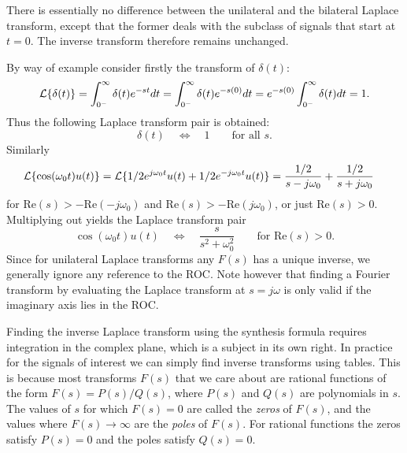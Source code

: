 \documentclass[10pt]{beamer}
\begin{document}
There is essentially no difference between the unilateral and the bilateral Laplace transform, except that the former deals with the subclass of signals that start at $t=0$.  The inverse transform therefore remains unchanged.

By way of example consider firstly the transform of $\delta(t)$:
\begin{equation*}
  {\cal L}\{ \delta(t) \} = \int_{0^-}^\infty \delta(t) e^{-st} dt =  \int_{0^-}^\infty \delta(t) e^{-s(0)} dt 
  = e^{-s(0)} \int_{0^-}^\infty \delta(t) dt = 1.
\end{equation*}
Thus the following Laplace transform pair is obtained:
\begin{equation*}
  \delta(t) \quad \Longleftrightarrow \quad 1 \qquad \text{for all $s$}.
\end{equation*}
Similarly 
\begin{align*}
  {\cal L}\{ \cos(\omega_0 t) u(t) \} &= {\cal L}\{ 1/2 e^{j \omega_0 t} u(t) + 1/2 e^{-j \omega_0 t} u(t) \} 
  = \frac{1/2}{s-j \omega_0} + \frac{1/2}{s+j \omega_0}
\end{align*}
for $\text{Re}(s) > - \text{Re}(-j \omega_0)$ and $\text{Re}(s) > - \text{Re}(j \omega_0)$, or just $\text{Re}(s)>0$.  Multiplying out yields the Laplace transform pair
\begin{equation*}
  \cos(\omega_0 t) u(t) \quad \Longleftrightarrow \quad \frac{s}{s^2 + \omega_0^2} \qquad \text{for $\text{Re}(s)>0$}.
\end{equation*}
Since for unilateral Laplace transforms any $F(s)$ has a unique inverse, we generally ignore any reference to the ROC.  Note however that finding a Fourier transform by evaluating the Laplace transform at $s=j\omega$ is only valid if the imaginary axis lies in the ROC.

Finding the inverse Laplace transform using the synthesis formula requires integration in the complex plane, which is a subject in its own right.  In practice for the signals of interest we can simply find inverse transforms using tables.  This is because most transforms $F(s)$ that we care about are rational functions of the form $F(s) = P(s)/Q(s)$, where $P(s)$ and $Q(s)$ are polynomials in $s$.  The values of $s$ for which $F(s)=0$ are called the {\em zeros} of $F(s)$, and the values where $F(s) \to \infty$ are the {\em poles} of $F(s)$.  For rational functions the zeros satisfy $P(s)=0$ and the poles satisfy $Q(s)=0$.
\end{document}
